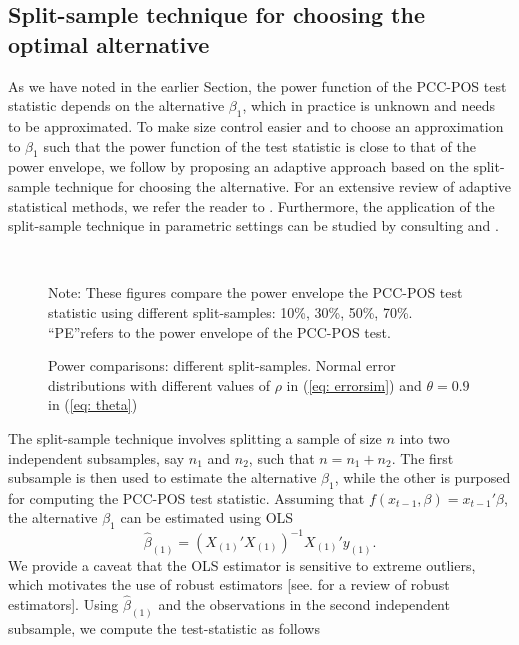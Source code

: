 \documentclass[harvard,11pt]{article}
\begin{document}
\subsection{Split-sample technique for choosing the optimal alternative \label{Choice of the optimal alternative hypothesis}}
As we have noted in the earlier Section, the power function of the PCC-POS test statistic depends on the alternative $\beta_1$, which in practice is unknown and needs to be approximated.	To make size control easier and to choose an approximation to $\beta_1$ such that the power function of the test statistic is close to that of the power envelope, we follow \citet{dufour2010exact} by proposing an adaptive approach based on the split-sample technique for choosing the alternative. For an extensive review of adaptive statistical methods, we refer the reader to \citet{o2004applied}. Furthermore, the application of the split-sample technique in parametric settings can be studied by consulting \citet{dufour2003point} and \citet{dufour2008finite}.  
\begin{figure}[tbph]
\caption{Power comparisons: different split-samples. Normal error distributions with
different values of $\rho $ in (\ref{eq: errorsim}) and $\theta =0.9$ in (\ref{eq: theta})}
\begin{center}
 \\[0pt]
\vspace{1pt}
\end{center}
\doublespacing
Note: These figures compare the power
envelope the PCC-POS test statistic using different split-samples: 10\%, 30\%, 50\%, 70\%. \textquotedblleft PE\textquotedblright refers to the power envelope of the PCC-POS test.
\label{fig: SS17}
\end{figure}
The split-sample technique involves splitting a sample of size $n$ into two independent subsamples, say $n_1$ and $n_2$, such that $n=n_1+n_2$. The first subsample is then used to estimate the alternative $\beta_1$, while the other is purposed for computing the PCC-POS test statistic. Assuming that $f(x_{t-1},\beta)=x_{t-1}'\beta$, the alternative $\beta_1$ can be estimated using OLS
\[
\hat{\beta}_{(1)}=(X_{(1)}'X_{(1)})^{-1}X_{(1)}'y_{(1)}.
\]
We provide a caveat that the OLS estimator is sensitive to extreme outliers, which motivates the use of robust estimators [see. \citet{maronna2019robust} for a review of robust estimators]. Using $\hat{\beta}_{(1)}$ and the observations in the second independent subsample, we compute the test-statistic as follows
\end{document}
